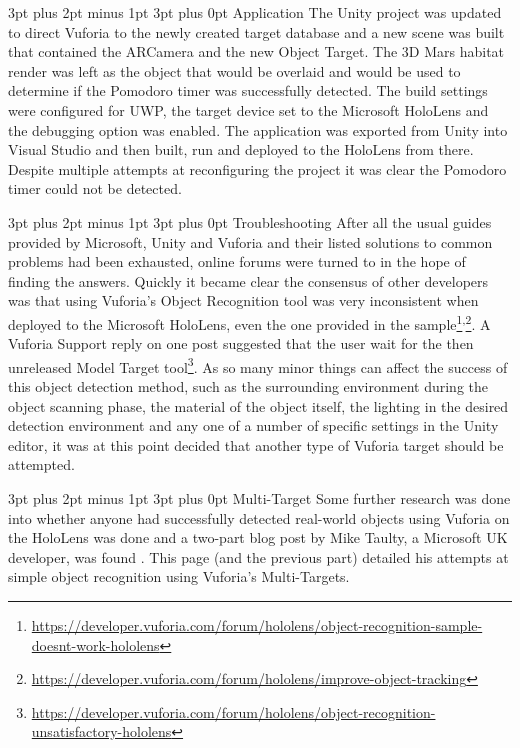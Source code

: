 \documentclass[12pt,a4paper,oneside]{article}
\makeatletter
\renewcommand\paragraph{\@startsection {paragraph}{1}{0mm} %
	                           {3pt plus 2pt minus 1pt} %
	                           {3pt plus 0pt} %
	                           {\normalfont}}
\renewcommand\subsubsection{\@startsection {subsubsection}{1}{0mm} %
	                           {3pt plus 2pt minus 1pt} %
	                           {3pt plus 0pt} %
	                           {\normalfont\bfseries}}
\makeatother
\begin{document}
\paragraph{Application}
The Unity project was updated to direct Vuforia to the newly created target database and a new scene was built that contained the ARCamera and the new Object Target. The 3D Mars habitat render was left as the object that would be overlaid and would be used to determine if the Pomodoro timer was successfully detected. The build settings were configured for UWP, the target device set to the Microsoft HoloLens and the debugging option was enabled. The application was exported from Unity into Visual Studio and then built, run and deployed to the HoloLens from there. Despite multiple attempts at reconfiguring the project it was clear the Pomodoro timer could not be detected.

\paragraph{Troubleshooting}
After all the usual guides provided by Microsoft, Unity and Vuforia and their listed solutions to common problems had been exhausted, online forums were turned to in the hope of finding the answers. Quickly it became clear the consensus of other developers was that using Vuforia's Object Recognition tool was very inconsistent when deployed to the Microsoft HoloLens, even the one provided in the sample\footnote{\url{https://developer.vuforia.com/forum/hololens/object-recognition-sample-doesnt-work-hololens}}\textsuperscript{,}\footnote{\url{https://developer.vuforia.com/forum/hololens/improve-object-tracking}}. A Vuforia Support reply on one post suggested that the user wait for the then unreleased Model Target tool\footnote{\url{https://developer.vuforia.com/forum/hololens/object-recognition-unsatisfactory-hololens}}. As so many minor things can affect the success of this object detection method, such as the surrounding environment during the object scanning phase, the material of the object itself, the lighting in the desired detection environment and any one of a number of specific settings in the Unity editor, it was at this point decided that another type of Vuforia target should be attempted.

\subsubsection{Multi-Target}
Some further research was done into whether anyone had successfully detected real-world objects using Vuforia on the HoloLens was done and a two-part blog post by Mike Taulty, a Microsoft UK developer, was found \cite{taulty16}. This page (and the previous part) detailed his attempts at simple object recognition using Vuforia's Multi-Targets.
\end{document}
